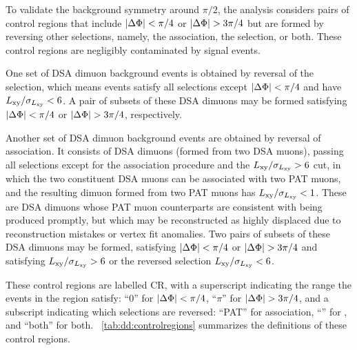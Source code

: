 To validate the background symmetry around $\pi/2$, the analysis considers pairs of control regions that include $|\Delta\Phi| < \pi/4$ or $|\Delta\Phi| > 3\pi/4$ but are formed by reversing other selections, namely, the \DSAToPAT association, the \LxySig selection, or both.
These control regions are negligibly contaminated by signal events.

One set of DSA dimuon background events is obtained by reversal of the \LxySig selection, which means events satisfy all selections except $|\Delta\Phi| < \pi/4$ and have $L_{\mathrm{xy}}/\sigma_{L_{\mathrm{xy}}} < 6$.
A pair of subsets of these DSA dimuons may be formed satisfying $|\Delta\Phi| < \pi/4$ or $|\Delta\Phi| > 3\pi/4$, respectively.

Another set of DSA dimuon background events are obtained by reversal of \DSAToPAT association.
It consists of DSA dimuons (formed from two DSA muons), passing all selections except for the \DSAToPAT association procedure and the $L_{\mathrm{xy}}/\sigma_{L_{\mathrm{xy}}} > 6$ cut, in which the two constituent DSA muons can be associated with two PAT muons, and the resulting dimuon formed from two PAT muons has $L_{\mathrm{xy}}/\sigma_{L_{\mathrm{xy}}} < 1$.
These are DSA dimuons whose PAT muon counterparts are consistent with being produced promptly, but which may be reconstructed as highly displaced due to reconstruction mistakes or vertex fit anomalies.
Two pairs of subsets of these DSA dimuons may be formed, satisfying $|\Delta\Phi| < \pi/4$ or $|\Delta\Phi| > 3\pi/4$ and satisfying $L_{\mathrm{xy}}/\sigma_{L_{\mathrm{xy}}} > 6$ or the reversed selection $L_{\mathrm{xy}}/\sigma_{L_{\mathrm{xy}}} < 6$.

These control regions are labelled CR, with a superscript indicating the \DeltaPhi range the events in the region satisfy: ``0'' for $|\Delta\Phi| < \pi/4$, ``$\pi$'' for $|\Delta\Phi| > 3\pi/4$, and a subscript indicating which selections are reversed: ``PAT'' for \DSAToPAT association, ``\Lxy'' for \LxySig, and ``both'' for both.
\Tab~\ref{tab:dd:controlregions} summarizes the definitions of these control regions.

